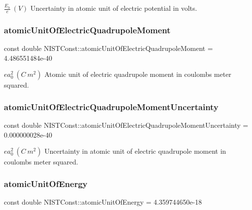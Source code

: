 $ \frac{E_h}{e}\ (V)$ Uncertainty in atomic unit of electric potential in volts. \mbox{\label{group___atomic_unit_gae7f2ec900567291168cdf7351248074d}} 
\subsubsection{\texorpdfstring{atomic\+Unit\+Of\+Electric\+Quadrupole\+Moment}{atomicUnitOfElectricQuadrupoleMoment}}
{\footnotesize\ttfamily const double N\+I\+S\+T\+Const\+::atomic\+Unit\+Of\+Electric\+Quadrupole\+Moment = 4.\+486551484e-\/40}

$e a_0^2 \ (C\ m^2)$ Atomic unit of electric quadrupole moment in coulombs meter squared. \mbox{\label{group___atomic_unit_gad42ce210c0b077347928b32c3d9357f3}} 
\subsubsection{\texorpdfstring{atomic\+Unit\+Of\+Electric\+Quadrupole\+Moment\+Uncertainty}{atomicUnitOfElectricQuadrupoleMomentUncertainty}}
{\footnotesize\ttfamily const double N\+I\+S\+T\+Const\+::atomic\+Unit\+Of\+Electric\+Quadrupole\+Moment\+Uncertainty = 0.\+000000028e-\/40}

$e a_0^2 \ (C\ m^2)$ Uncertainty in atomic unit of electric quadrupole moment in coulombs meter squared. \mbox{\label{group___atomic_unit_gadc3fdb8850235efe9e73bcf733fdbfe8}} 
\subsubsection{\texorpdfstring{atomic\+Unit\+Of\+Energy}{atomicUnitOfEnergy}}
{\footnotesize\ttfamily const double N\+I\+S\+T\+Const\+::atomic\+Unit\+Of\+Energy = 4.\+359744650e-\/18}

